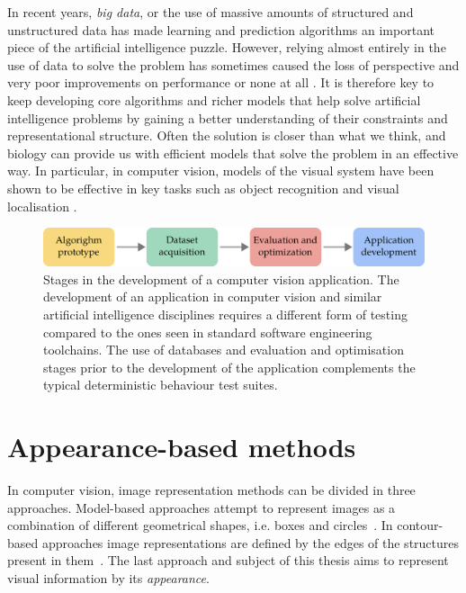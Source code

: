 In recent years, \textit{big data}, or the use of massive amounts of structured and unstructured data has made learning and prediction algorithms an important piece of the artificial intelligence puzzle. However, relying almost entirely in the use of data to solve the problem has sometimes caused the loss of perspective and very poor improvements on performance or none at all \cite{zhu2012we}. It is therefore key to keep developing core algorithms and richer models that help solve artificial intelligence problems by gaining a better understanding of their constraints and representational structure. Often the solution is closer than what we think, and biology can provide us with efficient models that solve the problem in an effective way. In particular, in computer vision, models of the visual system have been shown to be effective in key tasks such as object recognition and visual localisation \cite{lowe2004distinctive,milford2004ratslam}. 


\begin{figure}
\centering
\includegraphics[width=\linewidth]{gfx/Chapter01/cv_dev_pipeline.pdf}
\caption{Stages in the development of a computer vision application. The development of an application in computer vision and similar artificial intelligence disciplines requires a different form of testing compared to the ones seen in standard software engineering toolchains. The use of databases and evaluation and optimisation stages prior to the development of the application complements the typical deterministic behaviour test suites.}
\label{fig:cv_dev_pipeline}
\end{figure}

\section{Appearance-based methods}

In computer vision, image representation methods can be divided in three approaches. Model-based approaches attempt to represent images as a combination of different geometrical shapes, i.e. boxes and circles~\cite{biederman1987}. In contour-based approaches image representations are defined by the edges of the structures present in them~\cite{canny1986computational}. The last approach and subject of this thesis aims to represent visual information by its \textit{appearance}. 

